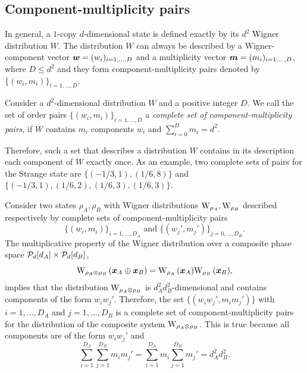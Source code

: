 \subsection{Component-multiplicity pairs}

In general, a $1$-copy $d$-dimensional state is defined exactly by its $d^2$ Wigner distribution $W$. 
The distribution $W$ can always be described by a Wigner-component vector $\bmw = (w_i)_{i=1,\dots,D}$ and a multiplicity vector $\bmm = (m_i)_{i=1,\dots,D}$, where $D \leq d^2$ and they form component-multiplicity pairs denoted by $\{(w_i, m_i)\}_{i=1,\dots,D}$.
\begin{definition}
	Consider a $d^2$-dimensional distribution $W$ and a positive integer $D$. 
	We call the set of order pairs $\{(w_i, m_i)\}_{i=1,\dots,D}$ a \emph{complete set of component-multiplicity pairs}, if $W$ contains $m_i$ components $w_i$ and $\sum_{i=0}^D m_i = d^2$.
\end{definition}
Therefore, such a set that describes a distribution $W$ contains in its description each component of $W$ exactly once.
As an example, two complete sets of pairs for the Strange state are $\{( -1/3, 1), ( 1/6, 8)\}$ and $\{(-1/3, 1), (1/6, 2), (1/6, 3), (1/6, 3)\}$.

Consider two states $\rho_A, \rho_B$ with Wigner distributions $\W{\rho_A}, \W{\rho_B}$ described respectively by complete sets of component-multiplicity pairs 
\begin{equation}
	\{(w_i, m_i)\}_{i=1,\dots,D_A} \text{ and } \{(w_j', m_j')\}_{j=0,\dots,D_B}.
\end{equation}
The multiplicative property of the Wigner distribution over a composite phase space $\cal{P}_d[d_A] \times \cal{P}_d[d_B]$,
\begin{equation}
	\W[\bmx_A \oplus \bmx_B]{\rho_A \otimes \rho_B} = \W[\bmx_A]{\rho_A}\W[\bmx_B]{\rho_B},
\end{equation}
implies that the distribution $\W{\rho_A \otimes \rho_B}$ is $d_A^2 d_B^2$-dimensional and contains components of the form $w_i w_j'$. 
Therefore, the set $\{(w_i w_j', m_i m_j')\}$ with $i=1,\dots,D_A$ and $j=1,\dots,D_B$ is a complete set of component-multiplicity pairs for the distribution of the composite system $\W{\rho_A \otimes \rho_B}$.
This is true because all components are of the form $w_i w_j'$ and 
\begin{equation*}
	\sum_{i=1}^{D_A}\sum_{j=1}^{D_B} m_i m_j' = \sum_{i=1}^{D_A} m_i \sum_{j=1}^{D_B} m_j' = d_A^2 d_B^2.
\end{equation*}

